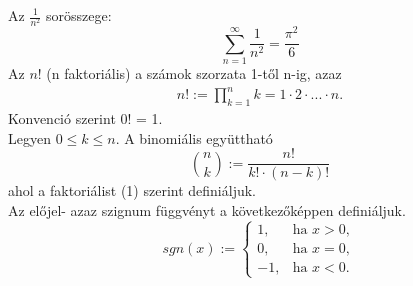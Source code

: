 \documentclass{article}
\begin{document}
Az $\frac{1}{n^2}$ sorösszege:
\[\sum_{n=1}^\infty \frac{1}{n^2}=\frac{\pi^2}{6}\]
Az $n!$ (n faktoriális) a számok szorzata 1-től n-ig, azaz
\begin{gather}
n!:=\prod_{k=1}^{n}k=1\cdot 2\cdot ...\cdot n.
\end{gather}
Konvenció szerint 0! = 1.\\
Legyen $0 \leq k \leq n$. A binomiális együttható
\[\binom{n}{k}:=\frac{n!}{k!\cdot (n-k)!}\]
ahol a faktoriálist (1) szerint definiáljuk.\\
Az előjel- azaz szignum függvényt a következőképpen definiáljuk.
\[sgn(x):=
\begin{cases}
1, & \text{ha } x>0, \\
0, & \text{ha } x=0, \\
-1, & \text{ha } x<0.
\end{cases}
\]
\end{document}
